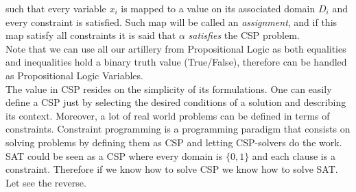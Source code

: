   such that every variable $x_i$ is mapped to a value on its associated domain $D_i$ and every constraint is satisfied. Such map will be called an \emph{assignment}, and if this map satisfy all constraints it is said that $\alpha$ \emph{satisfies} the CSP problem.\\


Note that we can use all our artillery from Propositional Logic as both equalities and inequalities hold a binary truth value (True/False), therefore can be handled as Propositional Logic Variables. \\

The value in CSP resides on the simplicity of its formulations.  One can  easily define a CSP just by selecting the desired conditions of a solution and describing its context. Moreover, a lot of real world problems can be defined in terms of constraints. Constraint programming is a programming paradigm that consists on solving problems by defining them as CSP and letting CSP-solvers do the work.\\

SAT could be seen as a CSP where every domain is $\{0,1\}$ and each clause is a constraint. Therefore if we know how to solve CSP we know how to solve SAT. Let see the reverse.

